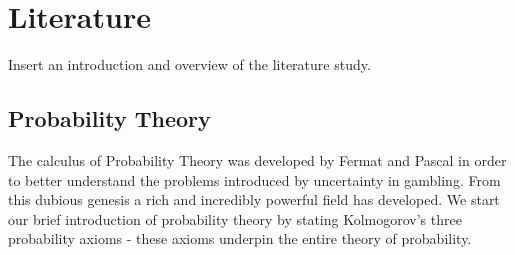 \documentclass[../masters.tex]{subfiles}
\begin{document}
\section{Literature}
Insert an introduction and overview of the literature study.

\subsection{Probability Theory}
The calculus of Probability Theory was developed by Fermat and Pascal in order to better understand the problems introduced by uncertainty in gambling. From this dubious genesis a rich and incredibly powerful field has developed. We start our brief introduction of probability theory by stating Kolmogorov's three probability axioms - these axioms underpin the entire theory of probability.
\end{document}
